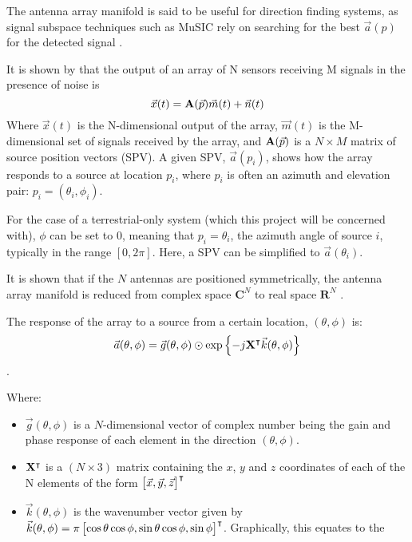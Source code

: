 The antenna array manifold is said to be useful for direction finding systems, as signal subspace techniques such as MuSIC rely on searching for the best \(\vec{a}(p)\) for the detected signal \cite{karimi1996manifold}. 

It is shown by \cite{dacos1995estimating} that the output of an array of N sensors receiving M signals in the presence of noise is
\begin{equation}
\vec{x}(t) = \mathbf{A}(\vec{p})\vec{m}(t) + \vec{n}(t)
\end{equation}
Where \(\vec{x}(t)\) is the N-dimensional output of the array, \(\vec{m}(t)\) is the M-dimensional set of signals received by the array, and \(\mathbf{A}(\vec{p})\) is a \(N \times M\) matrix of source position vectors (SPV). 
A given SPV, \(\vec{a}(p_i)\), shows how the array responds to a source at location \(p_i\), where \(p_i\) is often an azimuth and elevation pair: \(p_i = (\theta_i, \phi_i)\).

For the case of a terrestrial-only system (which this project will be concerned with), \(\phi\) can be set to 0, meaning that \(p_i = \theta_i\), the azimuth angle of source \(i\), typically in the range \([0, 2\pi]\). Here, a SPV can be simplified to \(\vec{a}(\theta_i)\).

It is shown that if the \(N\) antennas are positioned symmetrically, the antenna array manifold is reduced from complex space \(\mathbf{C}^N\) to real space \(\mathbf{R}^N\) \cite{dacos1995estimating}.

The response of the array to a source from a certain location, \((\theta, \phi)\) is:
\begin{equation}
\vec{a}(\theta, \phi) = \vec{g}(\theta, \phi) \odot \exp \left\{ -j \mathbf{X}^\intercal \vec{k}(\theta,\phi) \right\}
\end{equation}
\cite{dacos1995estimating}.

Where:
\begin{itemize}
  \item \(\vec{g}(\theta, \phi)\) is a \(N\)-dimensional vector of complex number being the gain and phase response  of each element in the direction \((\theta, \phi)\). 
\item \(\mathbf{X}^\intercal\) is a \((N \times 3)\) matrix containing the \(x\), \(y\) and \(z\) coordinates of each of the N elements of the form \(\begin{bmatrix} \vec{x}, \vec{y}, \vec{z} \end{bmatrix}^\intercal\)
\item \(\vec{k}(\theta, \phi)\) is the wavenumber vector given by \(\vec{k}(\theta, \phi) = \pi \begin{bmatrix} \cos\theta\cos\phi, \sin\theta\cos\phi, \sin\phi \end{bmatrix}^\intercal \). Graphically, this equates to the 
\end{itemize}

